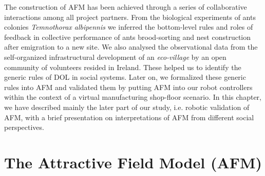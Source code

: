 The construction of AFM has been achieved through a series of collaborative interactions among all project partners. From the biological experiments of ants colonies {\em Temnothorax albipennis} we  inferred the bottom-level rules and roles of feedback in collective performance of ants brood-sorting and nest construction after emigration to a new site. We  also analysed the observational data from the self-organized infrastructural development of an {\em eco-village} by an open community of volunteers resided in Ireland. These helped us to identify the generic rules of DOL in social systems. Later on, we  formalized these generic rules into AFM \cite{Arcaute+2008} and validated them by putting AFM into our robot controllers within the context of a virtual manufacturing shop-floor scenario.  In this chapter, we have described mainly the later part of our study, i.e. robotic validation of AFM, with a brief presentation on interpretations of AFM from different social perspectives.
\section{The Attractive Field Model (AFM)}
\label{afm:model}

